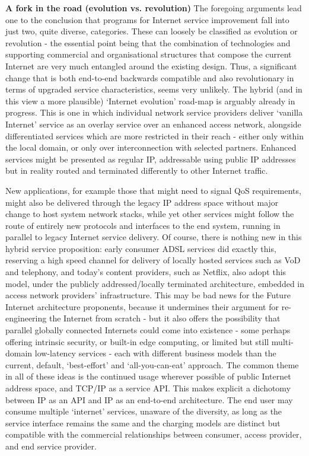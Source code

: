\textbf{A fork in the road (evolution vs. revolution)} The foregoing arguments lead one to the conclusion that programs for Internet service improvement fall into just two, quite diverse, categories. These can loosely be classified as evolution or revolution - the essential point being that the combination of technologies and supporting commercial and organisational structures that compose the current Internet are very much entangled around the existing design. Thus, a significant change that is both end-to-end backwards compatible and also revolutionary in terms of upgraded service characteristics, seems very unlikely.
The hybrid (and in this view a more plausible) ‘Internet evolution’ road-map is arguably already in progress. This is one in which individual network service providers deliver ‘vanilla Internet’ service as an overlay service over an enhanced access network, alongside differentiated services which are more restricted in their reach - either only within the local domain, or only over interconnection with selected partners.
Enhanced services might be presented as regular IP, addressable using public IP addresses but in reality routed and terminated differently to other Internet traffic.


New applications, for example those that might need to signal QoS requirements, might also be delivered through the legacy IP address space without major change to host system network stacks, while yet other services might follow the route of entirely new protocols and interfaces to the end system, running in parallel to legacy Internet service delivery.
Of course, there is nothing new in this hybrid service proposition: early consumer ADSL services did exactly this, reserving a high speed channel for delivery of locally hosted services such as VoD and telephony, and today's content providers, such as Netflix, also adopt this model, under the publicly addressed/locally terminated architecture, embedded in access network providers' infrastructure.
This may be bad news for the Future Internet architecture proponents, because it undermines their argument for re-engineering the Internet from scratch - but it also offers the possibility that parallel globally connected Internets could come into existence - some perhaps offering intrinsic security, or built-in edge computing, or limited but still multi-domain low-latency services - each with different business models than the current, default, `best-effort' and `all-you-can-eat' approach.
The common theme in all of these ideas is the continued usage wherever possible of public Internet address space, and TCP/IP as a service API.
This makes explicit a dichotomy between IP as an API and IP as an end-to-end architecture.
The end user may consume multiple ‘internet’ services, unaware of the diversity, as long as the service interface remains the same and the charging models are distinct but compatible with the commercial relationships between consumer, access provider, and end service provider.
\medskip

